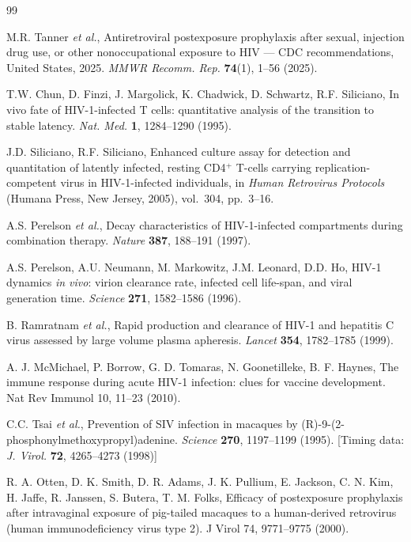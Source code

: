 \documentclass[10pt,letterpaper]{article}
\theoremstyle{definition}
\theoremstyle{remark}
\begin{document}
\begin{thebibliography}{99}

M.R. Tanner \textit{et al.}, Antiretroviral postexposure prophylaxis after sexual, injection drug use, or other nonoccupational exposure to HIV --- CDC recommendations, United States, 2025. \textit{MMWR Recomm. Rep.} \textbf{74}(1), 1--56 (2025). 

T.W. Chun, D. Finzi, J. Margolick, K. Chadwick, D. Schwartz, R.F. Siliciano, In vivo fate of HIV-1-infected T cells: quantitative analysis of the transition to stable latency. \textit{Nat. Med.} \textbf{1}, 1284--1290 (1995).

J.D. Siliciano, R.F. Siliciano, Enhanced culture assay for detection and quantitation of latently infected, resting CD4$^{+}$ T-cells carrying replication-competent virus in HIV-1-infected individuals, in \textit{Human Retrovirus Protocols} (Humana Press, New Jersey, 2005), vol.~304, pp.~3--16. 

A.S. Perelson \textit{et al.}, Decay characteristics of HIV-1-infected compartments during combination therapy. \textit{Nature} \textbf{387}, 188--191 (1997). 

A.S. Perelson, A.U. Neumann, M. Markowitz, J.M. Leonard, D.D. Ho, HIV-1 dynamics \textit{in vivo}: virion clearance rate, infected cell life-span, and viral generation time. \textit{Science} \textbf{271}, 1582--1586 (1996). 

B. Ramratnam \textit{et al.}, Rapid production and clearance of HIV-1 and hepatitis C virus assessed by large volume plasma apheresis. \textit{Lancet} \textbf{354}, 1782--1785 (1999). 

A. J. McMichael, P. Borrow, G. D. Tomaras, N. Goonetilleke, B. F. Haynes, The immune response during acute HIV-1 infection: clues for vaccine development. Nat Rev Immunol 10, 11–23 (2010).

C.C. Tsai \textit{et al.}, Prevention of SIV infection in macaques by (R)-9-(2-phosphonylmethoxypropyl)adenine. \textit{Science} \textbf{270}, 1197--1199 (1995). [Timing data: \textit{J. Virol.} \textbf{72}, 4265--4273 (1998)]

R. A. Otten, D. K. Smith, D. R. Adams, J. K. Pullium, E. Jackson, C. N. Kim, H. Jaffe, R. Janssen, S. Butera, T. M. Folks, Efficacy of postexposure prophylaxis after intravaginal exposure of pig-tailed macaques to a human-derived retrovirus (human immunodeficiency virus type 2). J Virol 74, 9771–9775 (2000).


\end{thebibliography}
\end{document}
